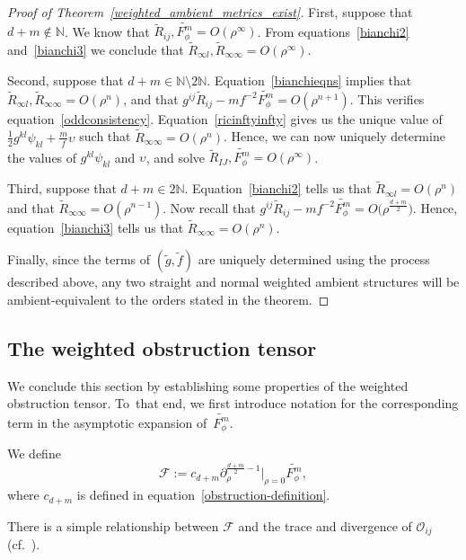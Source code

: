 \documentclass[10pt,a4paper]{amsart}
\numberwithin{equation}{section}
\begin{document}
\begin{proof}[Proof of Theorem~\ref{weighted_ambient_metrics_exist}]
First, suppose that $d+m\notin\mathbb{N}$. We know that $\widetilde{R}_{ij},\widetilde{F_\phi^m}=O(\rho^\infty)$. From equations~\eqref{bianchi2} and~\eqref{bianchi3} we conclude that $\widetilde{R}_{\infty l},\widetilde{R}_{\infty\infty}=O(\rho^\infty)$.

Second, suppose that $d+m\in \mathbb{N}\setminus 2\mathbb{N}$. Equation~\eqref{bianchieqns} implies that $\widetilde{R}_{\infty l},\widetilde{R}_{\infty\infty}=O(\rho^{n})$, and that $g^{ij}\widetilde{R}_{ij}-mf^{-2}\widetilde{F_\phi^m}=O(\rho^{n+1})$. This verifies equation~\eqref{oddconsistency}. Equation~\eqref{ricinftyinfty} gives us the unique value of $\frac{1}{2}g^{kl}\psi_{kl}+\frac{m}{f}\upsilon$ such that $\widetilde{R}_{\infty\infty}=O(\rho^{n})$. Hence, we can now uniquely determine the values of $g^{kl}\psi_{kl}$ and $\upsilon$, and solve $\widetilde{R}_{IJ},\widetilde{F_\phi^m}=O(\rho^\infty)$.

Third, suppose that $d+m\in 2\mathbb{N}$. Equation~\eqref{bianchi2} tells us that $\widetilde{R}_{\infty l}=O(\rho^n)$ and that $\widetilde{R}_{\infty\infty}=O(\rho^{n-1})$. Now recall that $g^{ij}\widetilde{R}_{ij}-mf^{-2}\widetilde{F_\phi^m}=O\big(\rho^{\frac{d+m}{2}}\big)$.
Hence, equation~\eqref{bianchi3} tells us that $\widetilde{R}_{\infty\infty}=O(\rho^n)$.

Finally, since the terms of $(\widetilde{g},\widetilde{f})$ are uniquely determined using the process described above, any two straight and normal weighted ambient structures will be ambient-equivalent to the orders stated in the theorem.
\end{proof}

\subsection{The weighted obstruction tensor}
We conclude this section by establishing some properties of the weighted obstruction tensor. To~that end, we first introduce notation for the corresponding term in the asymptotic expansion of~$\widetilde{F_\phi^m}$.
\begin{Definition}
We define
\[
\mathcal{F}:=c_{d+m}\partial_\rho^{\frac{d+m}{2}-1}\big|_{\rho=0}\widetilde{F_\phi^m},
\]
where $c_{d+m}$ is defined in equation~\eqref{obstruction-definition}.
\end{Definition}

There is a simple relationship between $\mathcal{F}$ and the trace and divergence of $\mathcal{O}_{ij}$ (cf.\ \cite{Case2014s}).
\end{document}
